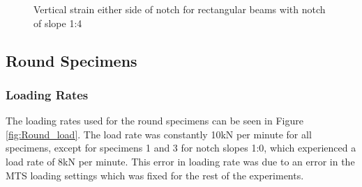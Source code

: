 \documentclass[11pt,a4paper]{article}
\numberwithin{equation}{subsection}
\begin{document}
\begin{figure}[h]
	\begin{center}
	\end{center}
	\caption{Vertical strain either side of notch for rectangular beams with notch of slope 1:4}
	\label{fig:Rect_14_Z_Y}
\end{figure}

\subsection{Round Specimens}
\subsubsection{Loading Rates}
The loading rates used for the round specimens can be seen in Figure \ref{fig:Round_load}. The load rate was constantly 10kN per minute for all specimens, except for specimens 1 and 3 for notch slopes 1:0, which experienced a load rate of 8kN per minute. This error in loading rate was due to an error in the MTS loading settings which was fixed for the rest of the experiments.
\end{document}

